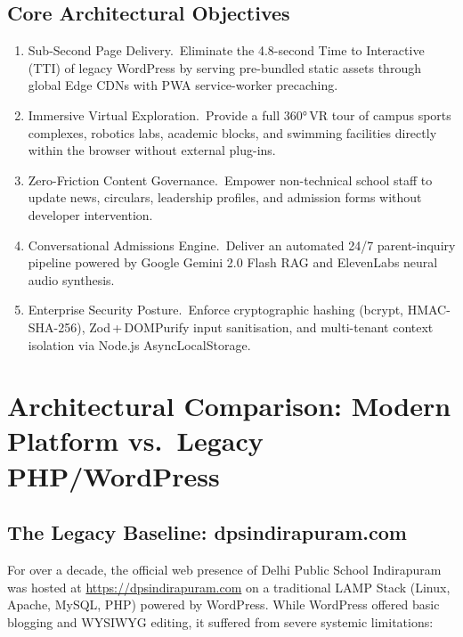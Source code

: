 \documentclass[12pt, a4paper, oneside]{report}
\def\textbf#1{#1}
\def\texttt#1{#1}
\begin{document}
\section{Core Architectural Objectives}

\begin{enumerate}
  \item \textbf{Sub-Second Page Delivery.}\ Eliminate the 4.8-second Time to
        Interactive (TTI) of legacy WordPress by serving pre-bundled static
        assets through global Edge CDNs with PWA service-worker precaching.
  \item \textbf{Immersive Virtual Exploration.}\ Provide a full 360°\,VR tour
        of campus sports complexes, robotics labs, academic blocks, and swimming
        facilities directly within the browser without external plug-ins.
  \item \textbf{Zero-Friction Content Governance.}\ Empower non-technical
        school staff to update news, circulars, leadership profiles, and
        admission forms without developer intervention.
  \item \textbf{Conversational Admissions Engine.}\ Deliver an automated
        24/7 parent-inquiry pipeline powered by Google Gemini 2.0 Flash RAG
        and ElevenLabs neural audio synthesis.
  \item \textbf{Enterprise Security Posture.}\ Enforce cryptographic hashing
        (bcrypt, HMAC-SHA-256), Zod\,+\,DOMPurify input sanitisation, and
        multi-tenant context isolation via Node.js \texttt{AsyncLocalStorage}.
\end{enumerate}


\chapter{Architectural Comparison: Modern Platform vs.\ Legacy PHP/WordPress}

\section{The Legacy Baseline: \texttt{dpsindirapuram.com}}

For over a decade, the official web presence of Delhi Public School Indirapuram
was hosted at \url{https://dpsindirapuram.com} on a traditional \textbf{LAMP
Stack} (Linux, Apache, MySQL, PHP) powered by \textbf{WordPress}.  While
WordPress offered basic blogging and WYSIWYG editing, it suffered from severe
systemic limitations:
\end{document}
